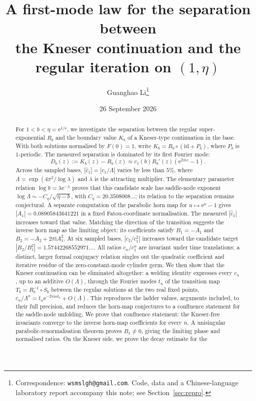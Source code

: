 \documentclass[11pt,a4paper]{article}
\title{A first-mode law for the separation between\\
the Kneser continuation and the regular iteration on $(1,\eta)$}
\author{%
  Guanghao Li\thanks{Correspondence: \texttt{wsmslgh@gmail.com}.  Code, data and
  a Chinese-language laboratory report accompany this note; see
  Section~\ref{sec:repro}.}%
}
\date{26 September 2026}
\theoremstyle{definition}
\newcommand{\Rr}{R}
\newcommand{\Kk}{K}
\newcommand{\eee}{\mathrm{e}}
\newcommand{\ii}{\mathrm{i}}
\begin{document}
\maketitle

\begin{abstract}
For $1<b<\eta=\eee^{1/\eee}$, we investigate the separation between the
regular super-exponential $\Rr_b$ and the boundary value $\Kk_b$ of a
Kneser-type continuation in the base.  With both solutions normalised by
$F(0)=1$, write $\Kk_b=\Rr_b\circ(\mathrm{id}+P_b)$, where $P_b$ is
$1$-periodic.  The measured separation is dominated by its first Fourier mode:
\[
 D_b(z):=\Kk_b(z)-\Rr_b(z)
 \approx c_1(b)\Rr_b'(z)(\eee^{2\pi\ii z}-1).
\]
Across the sampled bases, $|\hat c_1|=|c_1/\Lambda|$ varies by less than $5\%$,
where $\Lambda=\exp(4\pi^2/\log\lambda)$ and $\lambda$ is the attracting
multiplier.  The elementary parameter relation $\log b=\lambda\eee^{-\lambda}$
proves that this candidate scale has saddle-node exponent
$\log\Lambda\sim-C_\eta/\sqrt{\eta-b}$, with
$C_\eta=20.3508008\ldots$; its relation to the separation remains conjectural.
A separate computation of the parabolic horn map for $u\mapsto\eee^u-1$
gives $|A_1|=0.08905843641221$ in a fixed Fatou-coordinate normalisation.
The measured $|\hat c_1|$ increases toward that value.  Matching the direction
of the transition suggests the inverse horn map as the limiting object:
its coefficients satisfy $B_1=-A_1$ and $B_2=-A_2+2\pi\ii A_1^2$.
At six sampled bases, $|c_2/c_1^2|$ increases toward the candidate target
$|B_2/B_1^2|=1.57442268552971\ldots$.
All ratios $c_n/c_1^n$ are invariant under time translations; a distinct,
larger formal conjugacy relation singles out the quadratic coefficient and
iterative residue of the zero-constant-mode cylinder germ.
We then show that the Kneser continuation can be eliminated altogether:
a welding identity expresses every $c_n$, up to an additive $O(\Lambda)$, through
the Fourier modes $t_n$ of the transition map $T_b=\Rr_b^{-1}\circ S_b$
between the regular solutions at the two real fixed points,
$c_n/\Lambda^n=t_n\eee^{-2\pi\ii nt_0}+O(\Lambda)$.  This reproduces the
ladder values, arguments included, to their full precision, and reduces the
horn-map conjectures to a confluence statement for the saddle-node unfolding.
We prove that confluence statement: the Kneser-free invariants converge to
the inverse horn-map coefficients for every $n$.  A unisingular
parabolic-renormalisation theorem proves $B_1\ne0$, giving the limiting phase
and normalised ratios.  On the Kneser side, we prove the decay estimate for the

\end{abstract}
\end{document}
